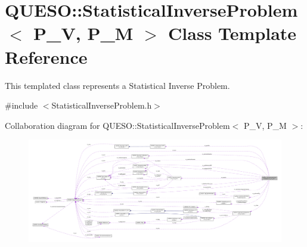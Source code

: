 \hypertarget{class_q_u_e_s_o_1_1_statistical_inverse_problem}{\section{Q\-U\-E\-S\-O\-:\-:Statistical\-Inverse\-Problem$<$ P\-\_\-\-V, P\-\_\-\-M $>$ Class Template Reference}
\label{class_q_u_e_s_o_1_1_statistical_inverse_problem}
}


This templated class represents a Statistical Inverse Problem.  




{\ttfamily \#include $<$Statistical\-Inverse\-Problem.\-h$>$}



Collaboration diagram for Q\-U\-E\-S\-O\-:\-:Statistical\-Inverse\-Problem$<$ P\-\_\-\-V, P\-\_\-\-M $>$\-:
\nopagebreak
\begin{figure}[H]
\begin{center}
\leavevmode
\includegraphics[width=350pt]{class_q_u_e_s_o_1_1_statistical_inverse_problem__coll__graph}
\end{center}
\end{figure}
